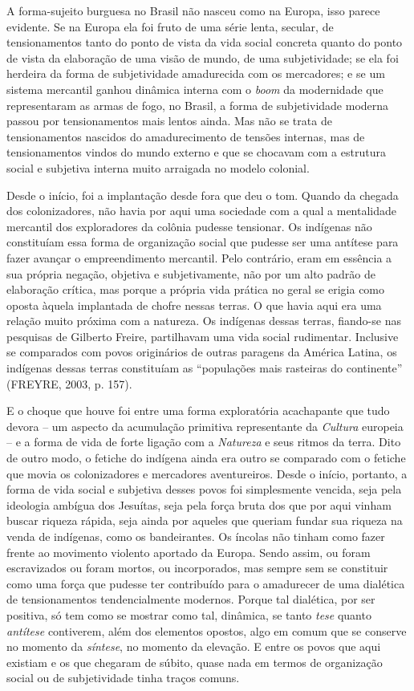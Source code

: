 A forma-sujeito burguesa no Brasil não nasceu como na Europa, isso
parece evidente. Se na Europa ela foi fruto de uma série lenta, secular,
de tensionamentos tanto do ponto de vista da vida social concreta quanto
do ponto de vista da elaboração de uma visão de mundo, de uma
subjetividade; se ela foi herdeira da forma de subjetividade amadurecida
com os mercadores; e se um sistema mercantil ganhou dinâmica interna com
o \emph{boom} da modernidade que representaram as armas de fogo, no
Brasil, a forma de subjetividade moderna passou por tensionamentos mais
lentos ainda. Mas não se trata de tensionamentos nascidos do
amadurecimento de tensões internas, mas de tensionamentos vindos do
mundo externo e que se chocavam com a estrutura social e subjetiva
interna muito arraigada no modelo colonial.

Desde o início, foi a implantação desde fora que deu o tom. Quando da
chegada dos colonizadores, não havia por aqui uma sociedade com a qual a
mentalidade mercantil dos exploradores da colônia pudesse tensionar. Os
indígenas não constituíam essa forma de organização social que pudesse
ser uma antítese para fazer avançar o empreendimento mercantil. Pelo
contrário, eram em essência a sua própria negação, objetiva e
subjetivamente, não por um alto padrão de elaboração crítica, mas porque
a própria vida prática no geral se erigia como oposta àquela implantada
de chofre nessas terras. O que havia aqui era uma relação muito próxima
com a natureza. Os indígenas dessas terras, fiando-se nas pesquisas de
Gilberto Freire, partilhavam uma vida social rudimentar. Inclusive se
comparados com povos originários de outras paragens da América Latina,
os indígenas dessas terras constituíam as ``populações mais rasteiras do
continente'' (FREYRE, 2003, p. 157).

E o choque que houve foi entre uma forma exploratória acachapante que
tudo devora -- um aspecto da acumulação primitiva representante da
\emph{Cultura} europeia -- e a forma de vida de forte ligação com a
\emph{Natureza} e seus ritmos da terra. Dito de outro modo, o fetiche do
indígena ainda era outro se comparado com o fetiche que movia os
colonizadores e mercadores aventureiros. Desde o início, portanto, a
forma de vida social e subjetiva desses povos foi simplesmente vencida,
seja pela ideologia ambígua dos Jesuítas, seja pela força bruta dos que
por aqui vinham buscar riqueza rápida, seja ainda por aqueles que
queriam fundar sua riqueza na venda de indígenas, como os bandeirantes.
Os íncolas não tinham como fazer frente ao movimento violento aportado
da Europa. Sendo assim, ou foram escravizados ou foram mortos, ou
incorporados, mas sempre sem se constituir como uma força que pudesse
ter contribuído para o amadurecer de uma dialética de tensionamentos
tendencialmente modernos. Porque tal dialética, por ser positiva, só tem
como se mostrar como tal, dinâmica, se tanto \emph{tese} quanto
\emph{antítese} contiverem, além dos elementos opostos, algo em comum
que se conserve no momento da \emph{síntese}, no momento da elevação. E
entre os povos que aqui existiam e os que chegaram de súbito, quase nada
em termos de organização social ou de subjetividade tinha traços comuns.

